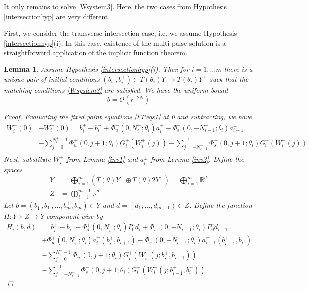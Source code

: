 \documentclass[12pt]{article}
\def\R{{\mathbb R}}
\newtheorem{lemma}{Lemma}
\begin{document}
It only remains to solve \eqref{Wsystem3}. Here, the two cases from Hypothesis \ref{intersectionhyp} are very different.

First, we consider the transverse intersection case, i.e. we assume Hypothesis \ref{intersectionhyp}(i). In this case, existence of the multi-pulse solution is a straightforward application of the implicit function theorem.

\begin{lemma}\label{inv3t}
Assume Hypothesis \ref{intersectionhyp}(i). Then for $i = 1, \dots m$ there is a unique pair of initial conditions $(b_i^-, b_i^+) \in T(\theta_i) Y^- \times T(\theta_i) Y^+$ such that the matching conditions \eqref{Wsystem3} are satisfied. We have the uniform bound
\begin{equation}\label{bboundt}
b = \mathcal{O}(r^{-2N})
\end{equation}

\begin{proof}
Evaluating the fixed point equations \eqref{FPeqs1} at 0 and subtracting, we have
\begin{align*}
W_i^+(0) &- W_i^-(0) = b_i^+ - b_i^- 
+ \Phi_u^+(0, N_i^+; \theta_i) a_i^+ - \Phi_s^-(0, -N_{i-1}^-; \theta_i) a_{i-1}^- \\
&- \sum_{j = 0}^{N_i^+-1} \Phi_u^+(0, j+1; \theta_i) G_i^+(W_i^+(j)) 
- \sum_{j = -N_{i-1}^-}^{-1} \Phi_s^-(0, j+1; \theta_i) G_i^-(W_i^-(j)) \\
\end{align*}
Next, substitute $W_i^\pm$ from Lemma \ref{inv1} and $a_i^\pm$ from Lemma \ref{inv2}. Define the spaces
\begin{align}\label{spaceYt}
Y &= \bigoplus_{i=1}^m (T(\theta) Y^+ \oplus T(\theta) 2Y^-) = \bigoplus_{i=1}^m \R^d \\
Z &= \bigoplus_{i=1}^{m-1} \R^d
\end{align}
Let $b = (b_1^+, b_1^-, \dots, b_m^+, b_m^-) \in Y$ and $d = (d_1, \dots, d_{m-1}) \in Z$. Define the function $H: Y \times Z \rightarrow Y$ component-wise by
\begin{align*}
H_i(b, d) &= 
 b_i^+ - b_i^- + \Phi_u^+(0, N_i^+; \theta_i) P_0^u d_i + \Phi_s^-(0, -N_{i-1}^-; \theta_i) P_0^s d_{i-1} \\
&+ \Phi_u^+(0, N_i^+; \theta_i) \tilde{a}_i^+(b_i^+, b_{i+1}^-) 
- \Phi_s^-(0, -N_{i-1}^-; \theta_i) \tilde{a}_{i-1}^-(b_{i-1}^+, b_i^-) \\
&- \sum_{j = 0}^{N_i^+-1} \Phi_u^+(0, j+1; \theta_i) G_i^+(W_i^+(j; b_i^+, b_{i+1}^-)) \\
&- \sum_{j = -N_{i-1}^-}^{-1} \Phi_s^-(0, j+1; \theta_i) G_i^-(W_i^-(j; b_{i-1}^+, b_i^-))
\end{align*}


\end{proof}
\end{lemma}
\end{document}
